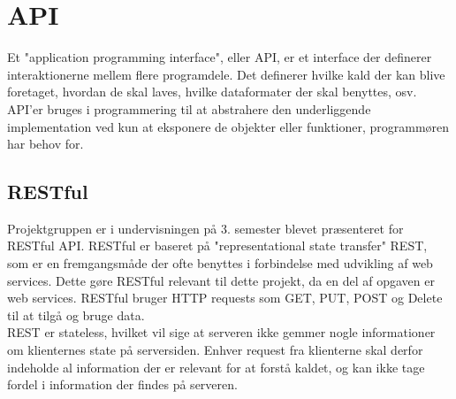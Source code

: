 \section{API}\label{sec:api}
Et "application programming interface", eller API, er et interface der definerer interaktionerne
mellem flere programdele. Det definerer hvilke kald der kan blive foretaget, hvordan de skal laves, 
hvilke dataformater der skal benyttes, osv. API'er bruges i programmering til at abstrahere den underliggende
implementation ved kun at eksponere de objekter eller funktioner, programmøren har behov for. \\

\subsection{RESTful}
Projektgruppen er i undervisningen på 3. semester blevet præsenteret for RESTful API. RESTful er
baseret på "representational state transfer" REST, som er en fremgangsmåde der ofte benyttes i forbindelse med
udvikling af web services. Dette gøre RESTful relevant til dette projekt, da en del af opgaven er web services.
RESTful bruger HTTP requests som GET, PUT, POST og Delete til at tilgå og bruge data. \\

REST er stateless, hvilket vil sige at serveren ikke gemmer nogle informationer om klienternes state på serversiden.
Enhver request fra klienterne skal derfor indeholde al information der er relevant for at forstå kaldet, og kan ikke
tage fordel i information der findes på serveren. 
